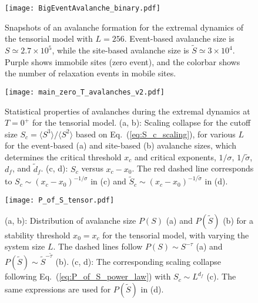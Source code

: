 \documentclass[pre,twocolumn,superscriptaddress,tightenlines,showpacs,longbibliography,floatfix,footinbib]{revtex4-1}
\begin{document}
\begin{figure}
\centering
\texttt{[image: BigEventAvalanche\_binary.pdf]}
\caption{
Snapshots of an avalanche formation for the extremal dynamics of the tensorial model with $L=256$.
Event-based avalanche size is $S \simeq 2.7 \times 10^5$, while the site-based avalanche size is $\tilde S \simeq 3 \times 10^4$.
Purple shows immobile sites (zero event), and the colorbar shows the number of relaxation events in mobile sites.
}
\label{fig:event_and_site_based_avalanches}
\end{figure}


\begin{figure}
\centering
\texttt{[image: main\_zero\_T\_avalanches\_v2.pdf]}
\caption{Statistical properties of avalanches during the extremal dynamics at $T=0^+$ for the tensorial model.
(a, b): Scaling collapse for the cutoff size $S_c=\langle S^3 \rangle / \langle S^2 \rangle$ based on Eq.~(\ref{eq:S_c_scaling}), for various $L$ for the event-based (a) and site-based (b) avalanche sizes, which determines the critical threshold $x_c$ and critical exponents, $1/\sigma$, $1/\tilde\sigma$, $d_f$, and $\tilde d_f$. 
(c, d): $S_c$ versus $x_c-x_0$. The red dashed line corresponds to $S_c \sim (x_c-x_0)^{-1/\sigma}$ in (c) and $\tilde S_c \sim (x_c-x_0)^{-1/\tilde \sigma}$ in (d). 
}
\label{fig:main_zero_T_avalanches}
\end{figure}


\begin{figure}
\centering
\texttt{[image: P\_of\_S\_tensor.pdf]}
\caption{(a, b): Distribution of avalanche size $P(S)$ (a) and $P(\tilde S)$ (b) for a stability threshold $x_0=x_c$ for the tensorial model, with varying the system size $L$. The dashed lines follow $P(S) \sim S^{-\tau}$ (a) and $P(\tilde S) \sim \tilde  S^{-\tilde  \tau}$ (b). (c, d): The corresponding scaling collapse following Eq.~(\ref{eq:P_of_S_power_law}) with $S_c \sim L^{d_f}$ (c). The same expressions are used for $P(\tilde S)$ in (d).
}
\label{fig:P_of_S_tensor}
\end{figure}
\end{document}
